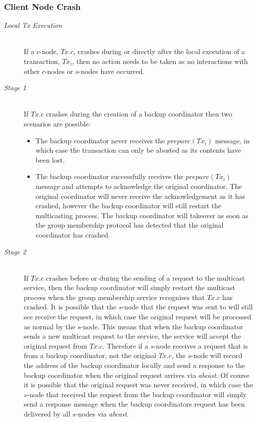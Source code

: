     \subsubsection*{Client Node Crash}
	\begin{description}
         \item[\emph{Local Tx Execution}]  \hfill \\
         If a $c$-node, $Tx.c$, crashes during or directly after the local execution of a transaction, $Tx_i$, then no action needs to be taken as no interactions with other $c$-nodes or $s$-nodes have occurred.  
		
		\item[\emph{Stage 1}]  \hfill \\
		If $Tx.c$ crashes during the creation of a backup coordinator then two scenarios are possible:
		    \begin{itemize}
			    \item    The backup coordinator never receives the $prepare(Tx_i)$ message, in which case the transaction  can only be aborted as its contents have been lost.  
			    \item    The backup coordinator successfully receives the $prepare(Tx_i)$ message and attempts to acknowledge the original coordinator.  The original coordinator will never receive the acknowledgement as it has crashed, however the backup coordinator will still restart the multicasting process. The backup coordinator will takeover as soon as the group membership protocol has detected that the original coordinator has crashed.
		    \end{itemize}     
		    
		\item[\emph{Stage 2}]  \hfill \\
        If $Tx.c$ crashes before or during the sending of a request to the multicast service, then the backup coordinator will simply restart the multicast process when the group membership service recognises that $Tx.c$ has crashed.  It is possible that the $s$-node that the request was sent to will still see receive the request, in which case the original request will be processed as normal by the $s$-node.  This means that when the backup coordinator sends a new multicast request to the service, the service will accept the original request from $Tx.c$.  Therefore if a $s$-node receives a request that is from a backup coordinator, not the original $Tx.c$, the $s$-node will record the address of the backup coordinator locally and send a response to the backup coordinator when the original request arrives via \emph{abcast}.  Of course it is possible that the original request was never received, in which case the $s$-node that received the request from the backup coordinator will simply send a response message when the backup coordinators request has been delivered by all $s$-nodes via \emph{abcast}.  
        

\end{description}
